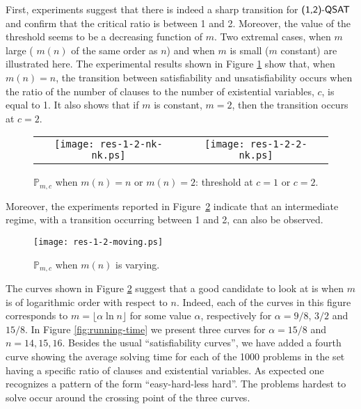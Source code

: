 \documentclass[aop,noinfoline]{imsart}
\newcommand{\onetwoqsat}{\mbox{\sf (1,2)-QSAT}}
\newcommand{\pmc}{\mathbb{P}_{m,c}}
\begin{document}
First, experiments suggest that there is indeed a sharp transition for $\onetwoqsat$ and confirm  that the critical ratio is between
1 and 2. Moreover, the value of the threshold seems to be a decreasing function of $m$. Two extremal cases, when $m$ large ( $m(n)$ of the same order as $n$) and  when $m$ is small ($m$ constant)  are illustrated here. 
The experimental results shown in Figure \ref{fig:threshold}
show  that, when $m(n)=n$, the transition between satisfiability
and unsatisfiability occurs when the ratio of the number of
clauses to the number of existential variables, $c$, is equal to
1. It also  shows that if $m$ is constant,
$m=2$, then the transition occurs at $c=2$.  



\begin{figure}[!h]
\begin{tabular}{cc}
\texttt{[image: res-1-2-nk-nk.ps]} 
& \texttt{[image: res-1-2-2-nk.ps]} \\
\end{tabular}
\caption{$\pmc$ when $m(n)=n$ or $m(n)=2$: threshold  at $c=1$ or   $c=2$.}
  \label{fig:threshold}
\end{figure}


Moreover, the
experiments reported in Figure~\ref{fig:curves-moving} indicate
that an intermediate regime, with a transition occurring 
between 1 and 2, can also be observed.




\begin{figure}[th]
  \centering
  \texttt{[image: res-1-2-moving.ps]}
  \caption{$\pmc$ when $m(n)$ is varying.}
  \label{fig:curves-moving}
\end{figure}




The curves
shown in Figure \ref{fig:curves-moving} suggest that a good
candidate to look at is when $m$ is of logarithmic order with
respect to $n$. Indeed, each of the curves in this figure
corresponds to $m=\lfloor \alpha \ln n\rfloor$ for some value
$\alpha$, respectively for $\alpha=9/8$, $3/2$ and $15/8$. In
Figure \ref{fig:running-time} we present three curves for
$\alpha=15/8$ and $n=14, 15, 16$. Besides the usual
``satisfiability curves'', we have added a fourth curve showing the
average solving time for each of the 1000 problems in the set
having a specific ratio of clauses and existential variables. As
expected one recognizes a pattern of the form ``easy-hard-less
hard''. The problems hardest to solve occur around the crossing
point of the three curves.
\end{document}

